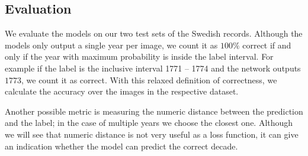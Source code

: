\subsection{Evaluation}

We evaluate the models on our two test sets of the Swedish records. Although the models only output a single year per image, we count it as $100\%$ correct if and only if the year with maximum probability is inside the label interval. For example if the label is the inclusive interval 1771 -- 1774 and the network outputs $1773$, we count it as correct. With this relaxed definition of correctness, we calculate the accuracy over the images in the respective dataset.

Another possible metric is measuring the numeric distance between the prediction and the label; in the case of multiple years we choose the closest one. Although we will see that numeric distance is not very useful as a loss function, it can give an indication whether the model can predict the correct decade.



